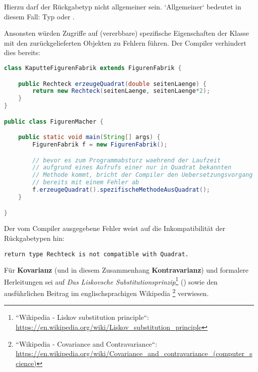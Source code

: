 Hierzu darf der Rückgabetyp nicht allgemeiner sein. `Allgemeiner` bedeutet in diesem Fall: Typ  oder .

Ansonsten würden Zugriffe auf (vererbbare) spezifische Eigenschaften der Klasse  mit den zurückgelieferten Objekten zu Fehlern führen.
Der Compiler verhindert dies bereits:

\begin{lstlisting}[language=java]
class KaputteFigurenFabrik extends FigurenFabrik {

    public Rechteck erzeugeQuadrat(double seitenLaenge) {
        return new Rechteck(seitenLaenge, seitenLaenge*2);
    }
}

public class FigurenMacher {

    public static void main(String[] args) {
        FigurenFabrik f = new FigurenFabrik();

        // bevor es zum Programmabsturz waehrend der Laufzeit
        // aufgrund eines Aufrufs einer nur in Quadrat bekannten
        // Methode kommt, bricht der Compiler den Uebersetzungsvorgang
        // bereits mit einem Fehler ab
        f.erzeugeQuadrat().spezifischeMethodeAusQuadrat();
    }

}
\end{lstlisting}

Der vom Compiler ausgegebene Fehler weist auf die Inkompatibilität der Rückgabetypen hin:

\begin{lstlisting}[language=text]
return type Rechteck is not compatible with Quadrat.
\end{lstlisting}

Für \textbf{Kovarianz} (und in diesem Zusammenhang \textbf{Kontravarianz}) und formalere Herleitungen sei auf
\textit{Das Liskovsche Substitutionsprinzip}\footnote{``Wikipedia - Liskov substitution principle``: \url{https://en.wikipedia.org/wiki/Liskov_substitution_principle}} (\cite{Lis87})
sowie den ausführlichen Beitrag im englischsprachigen Wikipedia \footnote{
    ``Wikipedia - Covariance and Contravariance``: \url{https://en.wikipedia.org/wiki/Covariance_and_contravariance_(computer_science)}
} verwiesen.
